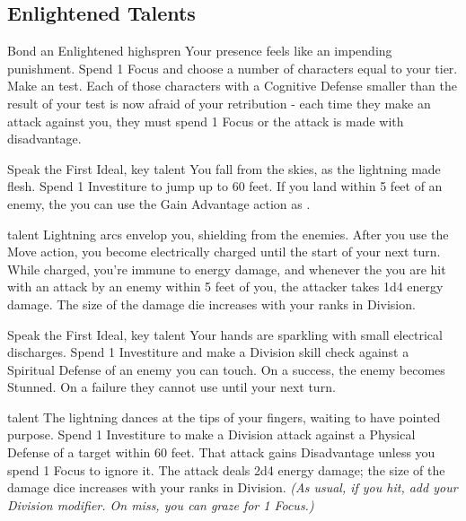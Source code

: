 \subsection{Enlightened Talents}


		{Bond an Enlightened highspren}
		{\iconAction}
		{Your presence feels like an impending punishment.}
		{Spend 1 Focus and choose a number of characters equal to your tier. Make an \skillIntimiation{} test. Each of those characters with a Cognitive Defense smaller than the result of your test is now afraid of your retribution - each time they make an attack against you, they must spend 1 Focus or the attack is made with disadvantage.}

\newpage
\talent{\talentSkybreakerLeapName}
		{Speak the First Ideal, \talentSkybreakerRetributionName{} key talent }
		{\iconAction}
		{You fall from the skies, as the lightning made flesh.}
		{Spend 1 Investiture to jump up to 60 feet. If you land within 5 feet of an enemy, the you can use the Gain Advantage action as \iconFreeAction{}.}

\talent{\talentSkybreakerShieldName}
		{\talentSkybreakerLeapName{} talent}
		{\iconFreeAction{}}
		{Lightning arcs envelop you, shielding from the enemies.}
		{After you use the Move action, you become electrically charged until the start of your next turn. While charged, you’re immune to energy damage, and whenever the you are hit with an attack by an enemy within 5 feet of you, the attacker takes 1d4 energy damage. The size of the damage die increases with your ranks in Division.}
		
\talent{\talentSkybreakerGraspName{}}
		{Speak the First Ideal, \talentSkybreakerRetributionName{} key talent }
		{\iconAction}
		{Your hands are sparkling with small electrical discharges.}
		{Spend 1 Investiture and make a Division skill check against a Spiritual Defense of an enemy you can touch. On a success, the enemy becomes Stunned. On a failure they cannot use \iconReaction{} until your next turn.}

\talent{\talentSkybreakerBoltName}
		{\talentSkybreakerGraspName{} talent }
		{\iconActionDouble}
		{The lightning dances at the tips of your fingers, waiting to have pointed purpose.}
		{Spend 1 Investiture to make a Division attack against a Physical Defense of a target within 60 feet. That attack gains Disadvantage unless you spend 1 Focus to ignore it. The attack deals 2d4 energy damage; the size of the damage dice increases with your ranks in Division. \textit{(As usual, if you hit, add your Division modifier. On miss, you can graze for 1 Focus.)}}


